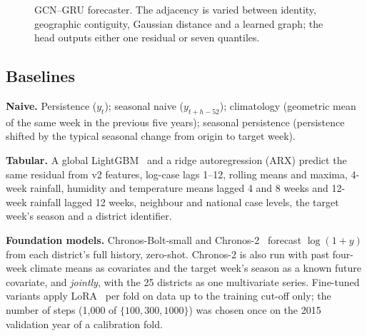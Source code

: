 \begin{figure}[t]
\centering
{}
\caption{GCN--GRU forecaster. The adjacency is varied between identity, geographic contiguity, Gaussian distance and a learned graph; the head outputs either one residual or seven quantiles.}
\label{fig:pipeline}
\end{figure}

\subsection{Baselines}
\textbf{Naive.} Persistence ($y_t$); seasonal naive ($y_{t+h-52}$); climatology (geometric mean of the same week in the previous five years); seasonal persistence (persistence shifted by the typical seasonal change from origin to target week).

\textbf{Tabular.} A global LightGBM~\cite{ke2017lightgbm} and a ridge autoregression (ARX) predict the same residual from v2 features, log-case lags 1--12, rolling means and maxima, 4-week rainfall, humidity and temperature means lagged 4 and 8 weeks and 12-week rainfall lagged 12 weeks, neighbour and national case levels, the target week's season and a district identifier.

\textbf{Foundation models.} Chronos-Bolt-small and Chronos-2~\cite{ansari2024chronos,ansari2025chronos2} forecast $\log(1+y)$ from each district's full history, zero-shot. Chronos-2 is also run with past four-week climate means as covariates and the target week's season as a known future covariate, and \emph{jointly}, with the 25 districts as one multivariate series. Fine-tuned variants apply LoRA~\cite{hu2022lora} per fold on data up to the training cut-off only; the number of steps (1,000 of $\{100,300,1000\}$) was chosen once on the 2015 validation year of a calibration fold.

